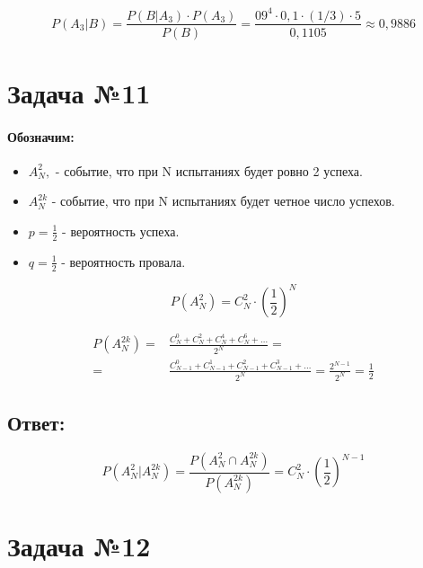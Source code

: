 \documentclass[a4paper, 12pt]{article} %
\begin{document}
\begin{equation*}
    P(A_3|B)= \frac{P(B|A_3)\cdot P(A_3)}{P(B)} = \frac{09^4 \cdot 0,1 \cdot (1/3) \cdot 5}{0,1105} \approx 0,9886 
\end{equation*}

\section*{Задача №11}
\paragraph{Обозначим:}
\begin{itemize}
    \item $A^2_N, $ - событие, что при N испытаниях будет ровно 2 успеха.
    \item $A^{2k}_{N}$ - событие, что при N испытаниях будет четное число успехов.
    \item $p = \frac{1}{2}$ - вероятность успеха.
    \item $q = \frac{1}{2}$ - вероятность провала.
\end{itemize}

\begin{equation*}
    P(A^2_N) = C^2_N \cdot \left( \frac{1}{2} \right)^N
\end{equation*}

\begin{align*}
    P(A^{2k}_N) = &\frac{C^0_N + C^2_N +C^4_N +C^6_N + \ldots}{2^N} = \\
    = &\frac{C^0_{N-1} + C^1_{N-1} +C^2_{N - 1} +C^3_{N - 1} + \ldots}{2^N} = \frac{2^{N - 1}}{2^N} 
    =\frac{1}{2}
\end{align*}

\subsection*{Ответ:}
\begin{equation*}
    P(A^2_N | A^{2k}_N) = \frac{P(A^2_N \cap A^{2k}_N)}{P(A^{2k}_N)} = 
    C^2_N \cdot \left( \frac{1}{2} \right)^{N - 1}
\end{equation*}

\section*{Задача №12}
\end{document}
